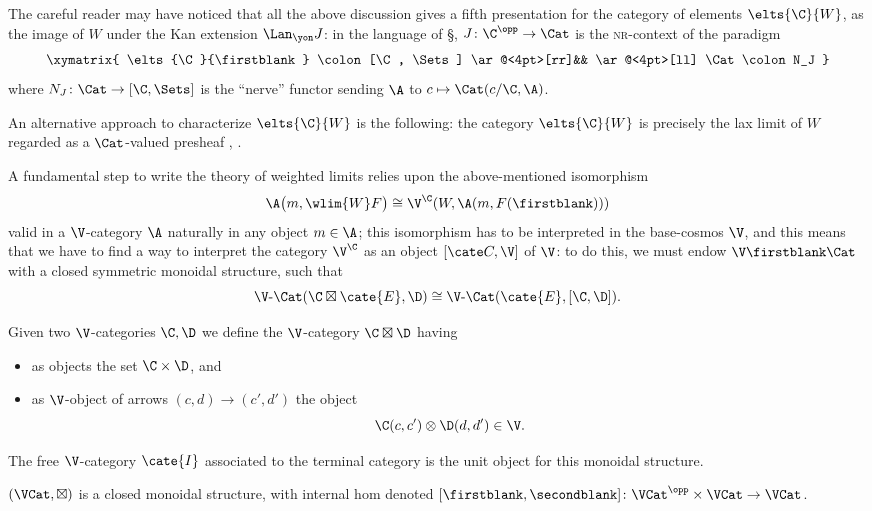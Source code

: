 \begin{remark}\label{its.another.nerve}
The careful reader may have noticed that all the above discussion gives a fifth presentation for the category of elements $\elts{\C}{W}$, as the image of $W$ under the Kan extension $\Lan_\yon J$: in the language of \S{}, $J\colon \C^\opp\to \Cat$ is the \textsc{nr}-context of the paradigm
\[
\xymatrix{
\elts{\C}{\firstblank} \colon [\C, \Sets]  \ar@<4pt>[rr]&& \ar@<4pt>[ll] \Cat\colon N_J
}
\]
where $N_J\colon \Cat \to  [\C, \Sets] $ is the ``nerve'' functor sending $\A$ to $c\mapsto \Cat(c/\C, \A)$.
\end{remark}
\begin{remark}
An alternative approach to characterize $\elts{\C}{W}$ is the following: the category $\elts{\C}{W}$ is precisely the lax limit of $W$ regarded as a $\Cat$-valued presheaf \cite[\S\textbf{4}]{2catlimits}, \cite{Graya,Street19}.
\end{remark}
A fundamental step to write the theory of weighted limits relies upon the above-mentioned isomorphism
\[
\A\big(m,\wlim{W}F\big) \cong \V^{\C}(W, \A(m,F(\firstblank)))
\]
valid in a $\V$-category $\A$ naturally in any object $m\in\A$; this isomorphism has to be interpreted in the base-cosmos $\V$, and this means that we have to find a way to interpret the category $\V^\C$ as an object $[\cate C,{\V}]$ of $\V$: to do this, we must endow $\V\text{\firstblank}\Cat$ with a closed symmetric monoidal structure, such that
\[\label{closurenrich}
\V\text{-}\Cat(\C\boxtimes \cate{E}, \D) \cong 
\V\text{-}\Cat(\cate{E}, [\C,\D]).
\]
\begin{definition}\label{cosmuclosed}
Given two $\V$-categories $\C, \D$ we define the $\V$-category $\C\boxtimes\D$ having
\begin{itemize}
\item as objects the set $\C\times\D$, and 
\item as $\V$-object of arrows $(c,d)\to (c',d')$ the object
\[
\C(c,c')\otimes \D(d,d')\in\V.
\]
\end{itemize}
The free $\V$-category $\cate{I}$ associated to the terminal category is the unit object for this monoidal structure.
\end{definition}
\begin{proposition}
$(\VCat,\boxtimes)$ is a closed monoidal structure, with internal hom denoted $[\firstblank,\secondblank]\colon \VCat^\opp\times \VCat \to \VCat$.
\end{proposition} 
